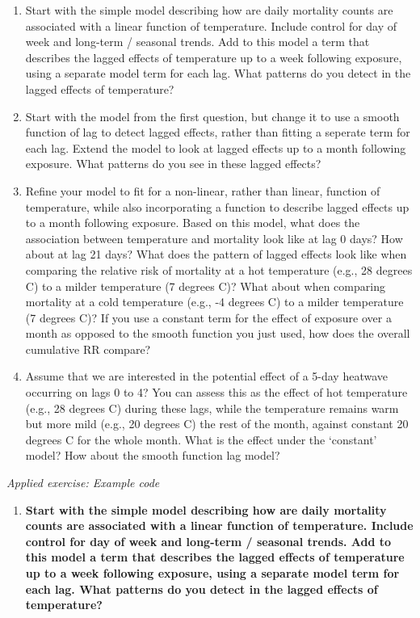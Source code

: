 \documentclass[
]{book}
\providecommand{\tightlist}{%
  \setlength{\itemsep}{0pt}\setlength{\parskip}{0pt}}
\begin{document}
\begin{enumerate}
\def\labelenumi{\arabic{enumi}.}
\tightlist
\item
  Start with the simple model describing how are daily mortality counts are
  associated with a linear function of temperature. Include control for day of
  week and long-term / seasonal trends. Add to this model a term that describes
  the lagged effects of temperature up to a week following exposure, using a
  separate model term for each lag. What patterns do you detect in the lagged
  effects of temperature?
\item
  Start with the model from the first question, but change it to use a smooth
  function of lag to detect lagged effects, rather than fitting a seperate term
  for each lag. Extend the model to look at lagged effects up to a month following
  exposure. What patterns do you see in these lagged effects?
\item
  Refine your model to fit for a non-linear, rather than linear, function
  of temperature, while also incorporating a function to describe lagged effects up
  to a month following exposure. Based on this model, what does the association
  between temperature and mortality look like at lag 0 days? How about at lag 21 days?
  What does the pattern of lagged effects look like when comparing the relative risk of
  mortality at a hot temperature (e.g., 28 degrees C) to a milder temperature
  (7 degrees C)? What about when comparing mortality at a cold temperature
  (e.g., -4 degrees C) to a milder temperature (7 degrees C)? If you use a constant
  term for the effect of exposure
  over a month as opposed to the smooth function you just used, how does the overall
  cumulative RR compare?
\item
  Assume that we are interested in the potential effect of a 5-day
  heatwave occurring on lags 0 to 4? You can assess this as the effect of hot temperature
  (e.g., 28 degrees C) during these lags, while the temperature remains warm but more
  mild (e.g., 20 degrees C) the rest of the month, against constant 20 degrees C for
  the whole month. What is the effect under the `constant' model? How about the smooth
  function lag model?
\end{enumerate}

\emph{Applied exercise: Example code}

\begin{enumerate}
\def\labelenumi{\arabic{enumi}.}
\tightlist
\item
  \textbf{Start with the simple model describing how are daily mortality counts are
  associated with a linear function of temperature. Include control for day of
  week and long-term / seasonal trends. Add to this model a term that describes
  the lagged effects of temperature up to a week following exposure, using a
  separate model term for each lag. What patterns do you detect in the lagged
  effects of temperature?}
\end{enumerate}
\end{document}
